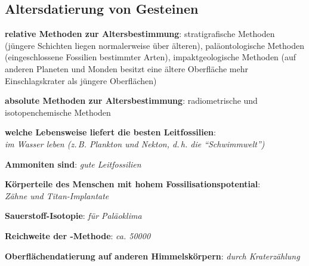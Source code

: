 \pagebreak

\subsection{%
    Altersdatierung von Gesteinen%
}

\textbf{relative Methoden zur Altersbestimmung}:
stratigrafische Methoden
(jüngere Schichten liegen normalerweise über älteren),
paläontologische Methoden
(eingeschlossene Fossilien bestimmter Arten),
impaktgeologische Methoden
(auf anderen Planeten und Monden besitzt eine ältere Oberfläche mehr Einschlagskrater
als jüngere Oberflächen)

\textbf{absolute Methoden zur Altersbestimmung}:
radiometrische und isotopenchemische Methoden

\begin{wichtig}
    \item
    \textbf{welche Lebensweise liefert die besten Leitfossilien}:\\
    \emph{im Wasser leben (z.\,B. Plankton und Nekton, d.\,h. die "`Schwimmwelt"')}

    \item
    \textbf{Ammoniten sind}:
    \emph{gute Leitfossilien}

    \item
    \textbf{Körperteile des Menschen mit hohem Fossilisationspotential}:\\
    \emph{Zähne und Titan-Implantate}

    \item
    \textbf{Sauerstoff-Isotopie}:
    \emph{für Paläoklima}

    \item
    \textbf{Reichweite der -Methode}:
    \emph{ca. \SI[math-rm=\mathit,text-rm=\itshape]{50000}{\year}}

    \item
    \textbf{Oberflächendatierung auf anderen Himmelskörpern}:
    \emph{durch Kraterzählung}
\end{wichtig}

\pagebreak
